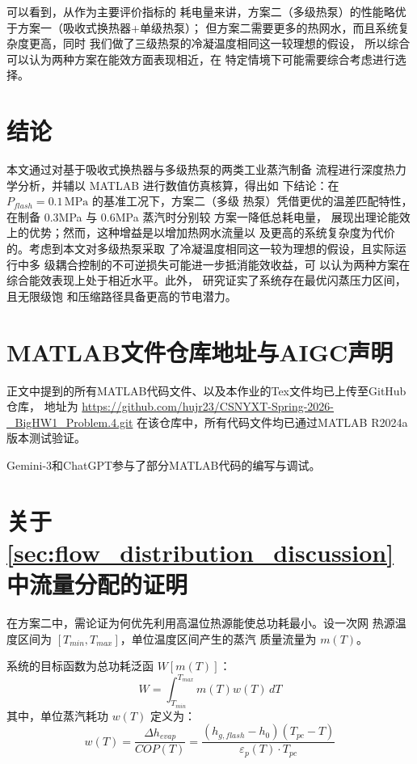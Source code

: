 \documentclass{thuemp}
\begin{document}
可以看到，从作为主要评价指标的
耗电量来讲，方案二（多级热泵）的性能略优
于方案一（吸收式换热器+单级热泵）；
但方案二需要更多的热网水，而且系统复杂度更高，同时
我们做了三级热泵的冷凝温度相同这一较理想的假设，
所以综合可以认为两种方案在能效方面表现相近，在
特定情境下可能需要综合考虑进行选择。


\section{结论}


本文通过对基于吸收式换热器与多级热泵的两类工业蒸汽制备
流程进行深度热力学分析，并辅以 MATLAB 进行数值仿真核算，得出如
下结论：在 $P_{flash}=0.1\,\text{MPa}$ 的基准工况下，方案二（多级
热泵）凭借更优的温差匹配特性，在制备 0.3MPa 与 0.6MPa 蒸汽时分别较
方案一降低总耗电量，
展现出理论能效上的优势；然而，这种增益是以增加热网水流量以
及更高的系统复杂度为代价的。考虑到本文对多级热泵采取
了冷凝温度相同这一较为理想的假设，且实际运行中多
级耦合控制的不可逆损失可能进一步抵消能效收益，可
以认为两种方案在综合能效表现上处于相近水平。此外，
研究证实了系统存在最优闪蒸压力区间，且无限级饱
和压缩路径具备更高的节电潜力。











\appendix
\section{MATLAB文件仓库地址与AIGC声明}

正文中提到的所有MATLAB代码文件、以及本作业的Tex文件均已上传至GitHub仓库，
地址为
\url{https://github.com/hujr23/CSNYXT-Spring-2026-_BigHW1_Problem.4.git}
在该仓库中，所有代码文件均已通过MATLAB R2024a版本测试验证。

Gemini-3和ChatGPT参与了部分MATLAB代码的编写与调试。



\section{关于\ref{sec:flow_distribution_discussion}中流量分配的证明}

在方案二中，需论证为何优先利用高温位热源能使总功耗最小。设一次网
热源温度区间为 $[T_{min}, T_{max}]$，单位温度区间产生的蒸汽
质量流量为 $m(T)$。

系统的目标函数为总功耗泛函 $W[m(T)]$：
\begin{equation}
W = \int_{T_{min}}^{T_{max}} m(T) w(T) \, dT
\end{equation}
其中，单位蒸汽耗功 $w(T)$ 定义为：
\begin{equation}
w(T) = \frac{\Delta h_{evap}}{COP(T)} = \frac{(h_{g,flash} - h_0)(T_{pc} - T)}{\varepsilon_p(T) \cdot T_{pc}}
\end{equation}
\end{document}
